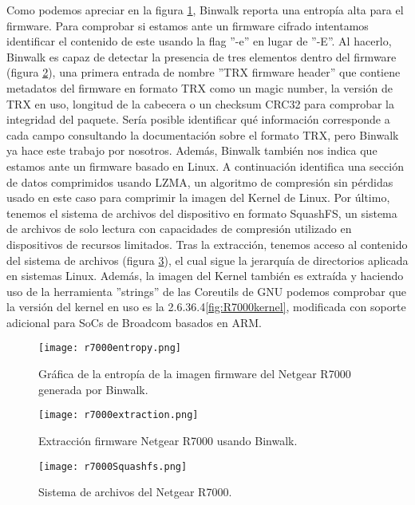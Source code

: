 Como podemos apreciar en la figura \ref{fig:binwalkEnt}, Binwalk reporta una entropía alta para el firmware. Para comprobar si estamos
ante un firmware cifrado intentamos identificar el contenido de este usando la flag ''-e'' en lugar de ''-E''. Al hacerlo, Binwalk es capaz de detectar 
la presencia de tres elementos dentro del firmware (figura \ref{fig:binwalkExt}), una primera entrada de nombre ''TRX firmware header'' que contiene metadatos
del firmware en formato TRX como un magic number, la versión de TRX en uso, longitud de la cabecera o un checksum CRC32 para comprobar la integridad del paquete. Sería posible
identificar qué información corresponde a cada campo consultando la documentación sobre el formato TRX\cite{firmwareFormat}, pero Binwalk ya hace este trabajo 
por nosotros. Además, Binwalk también nos indica que estamos ante un firmware basado en Linux. A continuación identifica una sección de datos comprimidos usando LZMA, un algoritmo
de compresión sin pérdidas usado en este caso para comprimir la imagen del Kernel de Linux. Por último, tenemos el sistema de archivos del dispositivo en formato
SquashFS, un sistema de archivos de solo lectura con capacidades de compresión utilizado en dispositivos de recursos limitados. Tras la extracción, tenemos acceso 
al contenido del sistema de archivos (figura \ref{fig:R7000squashfs}), el cual sigue la jerarquía de directorios aplicada en sistemas Linux. Además, la imagen 
del Kernel también es extraída y haciendo uso de la herramienta ''strings'' de las Coreutils de GNU podemos comprobar que la versión del kernel en uso es la 
2.6.36.4\ref{fig:R7000kernel}, modificada con soporte adicional para SoCs de Broadcom basados en ARM.

\begin{figure}[H]
    \centering
    \texttt{[image: r7000entropy.png]}
    \caption{Gráfica de la entropía de la imagen firmware del Netgear R7000 generada por Binwalk.}
    \label{fig:binwalkEnt}
\end{figure}

\begin{figure}[H]
    \centering
    \texttt{[image: r7000extraction.png]}
    \caption{Extracción firmware Netgear R7000 usando Binwalk.}
    \label{fig:binwalkExt}
\end{figure}

\begin{figure}[H]
    \centering
    \texttt{[image: r7000Squashfs.png]}
    \caption{Sistema de archivos del Netgear R7000.}
    \label{fig:R7000squashfs}
\end{figure}

